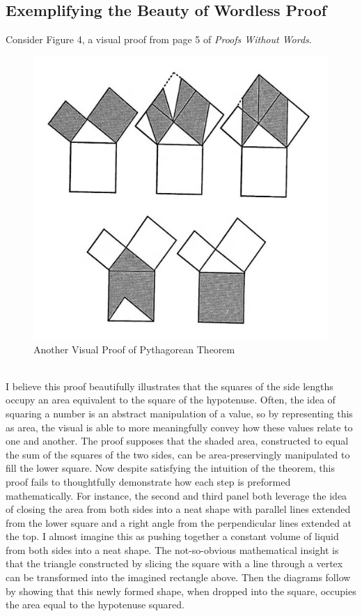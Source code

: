 \documentclass[11pt,a4paper]{article}
\begin{document}
\subsection{Exemplifying the Beauty of Wordless Proof}
Consider Figure 4, a visual proof from page 5 of \textit{Proofs Without Words}. \\
\begin{figure}[h]
\begin{center}
\includegraphics[scale=.45]{another pt} 
\caption{Another Visual Proof of Pythagorean Theorem}
\end{center}
\end{figure}\\
I believe this proof beautifully illustrates that the squares of the side lengths occupy an area equivalent to the square of the hypotenuse. Often, the idea of squaring a number is an abstract manipulation of a value, so by representing this as area, the visual is able to more meaningfully convey how these values relate to one and another. The proof supposes that the shaded area, constructed to equal the sum of the squares of the two sides, can be area-preservingly manipulated to fill the lower square. Now despite satisfying the intuition of the theorem, this proof fails to thoughtfully demonstrate how each step is preformed mathematically. For instance, the second and third panel both leverage the idea of closing the area from both sides into a neat shape with parallel lines extended from the lower square and a right angle from the perpendicular lines extended at the top. I almost imagine this as pushing together a constant volume of liquid from both sides into a neat shape. The not-so-obvious mathematical insight is that the triangle constructed by slicing the square with a line through a vertex can be transformed into the imagined rectangle above. Then the diagrams follow by showing that this newly formed shape, when dropped into the square, occupies the area equal to the hypotenuse squared. \\ \\
\end{document}
